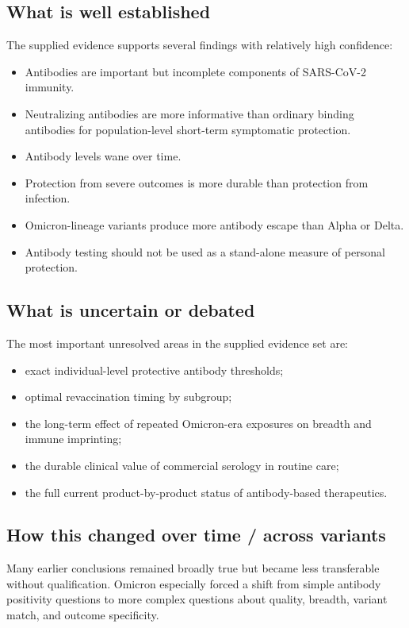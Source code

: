 \documentclass[12pt]{article}
\begin{document}
\subsection*{What is well established}
The supplied evidence supports several findings with relatively high confidence:
\begin{itemize}[leftmargin=1.5em]
    \item Antibodies are important but incomplete components of SARS-CoV-2 immunity.
    \item Neutralizing antibodies are more informative than ordinary binding antibodies for population-level short-term symptomatic protection.
    \item Antibody levels wane over time.
    \item Protection from severe outcomes is more durable than protection from infection.
    \item Omicron-lineage variants produce more antibody escape than Alpha or Delta.
    \item Antibody testing should not be used as a stand-alone measure of personal protection.
\end{itemize}

\subsection*{What is uncertain or debated}
The most important unresolved areas in the supplied evidence set are:
\begin{itemize}[leftmargin=1.5em]
    \item exact individual-level protective antibody thresholds;
    \item optimal revaccination timing by subgroup;
    \item the long-term effect of repeated Omicron-era exposures on breadth and immune imprinting;
    \item the durable clinical value of commercial serology in routine care;
    \item the full current product-by-product status of antibody-based therapeutics.
\end{itemize}

\subsection*{How this changed over time / across variants}
Many earlier conclusions remained broadly true but became less transferable without qualification. Omicron especially forced a shift from simple antibody positivity questions to more complex questions about quality, breadth, variant match, and outcome specificity.
\end{document}
